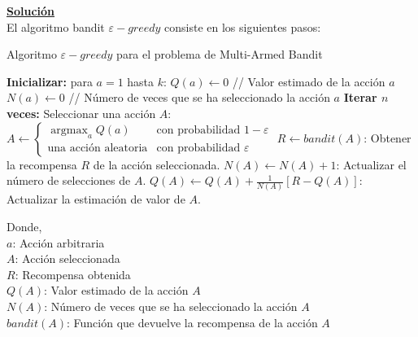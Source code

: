 \documentclass[12pt]{article}
\newlength\tindent
\renewcommand{\indent}{\hspace*{\tindent}}
\DeclareMathOperator*{\argmax}{argmax}
\begin{document}
    \indent\underline{\textbf{Solución}}\\
    El algoritmo bandit $\varepsilon-greedy$ consiste en los siguientes pasos\footnotemark:

    \begin{algorithm}[H]
        \caption[Algoritmo $\varepsilon-greedy$ para el problema de Multi-Armed Bandit]{Algoritmo $\varepsilon-greedy$ para el problema de Multi-Armed Bandit~\cite{UnityRL}}
        \begin{algorithmic}[1]
            \State \textbf{Inicializar:} para $a = 1$ hasta $k$:
            \State \quad $Q(a) \leftarrow 0$ \quad // Valor estimado de la acción $a$
            \State \quad $N(a) \leftarrow 0$ \quad // Número de veces que se ha seleccionado la acción $a$
            \State \textbf{Iterar $n$ veces:}
            \State \quad Seleccionar una acción $A$:
            \State \quad \quad $A \leftarrow
            \begin{cases}
                \argmax_{a} Q(a) & \text{con probabilidad } 1 - \varepsilon \\
                \text{una acción aleatoria} & \text{con probabilidad } \varepsilon
            \end{cases}$
            \State \quad $R \leftarrow bandit(A)$: Obtener la recompensa $R$ de la acción seleccionada.
            \State \quad $N(A) \leftarrow N(A) + 1$: Actualizar el número de selecciones de $A$.
            \State \quad $Q(A) \leftarrow Q(A) + \frac{1}{N(A)} [R - Q(A)]$: Actualizar la estimación de valor de $A$.
        \end{algorithmic}\label{alg:epsilon_greedy}
    \end{algorithm}

    Donde,\\
    $a$: Acción arbitraria \\
    $A$: Acción seleccionada \\
    $R$: Recompensa obtenida \\
    $Q(A)$: Valor estimado de la acción $A$ \\
    $N(A)$: Número de veces que se ha seleccionado la acción $A$ \\
    $bandit(A)$: Función que devuelve la recompensa de la acción $A$ \\
\end{document}
